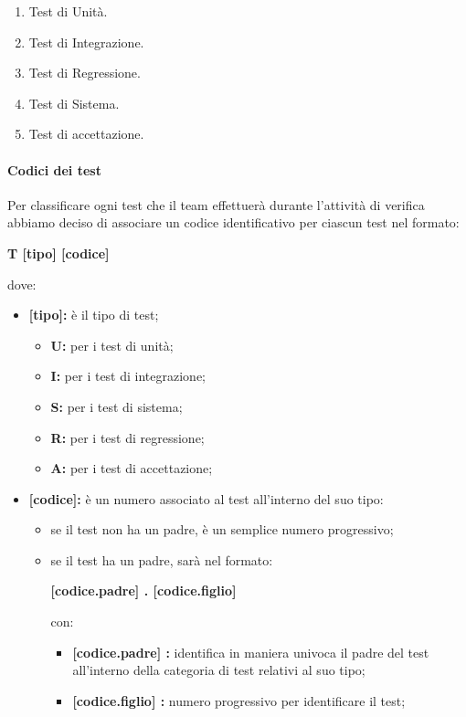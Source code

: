\begin{enumerate}
    \item Test di Unità.
    \item Test di Integrazione.
    \item Test di Regressione.
    \item Test di Sistema.
    \item Test di accettazione.
\end{enumerate}

\paragraph{Codici dei test}
Per classificare ogni test che il team effettuerà durante l'attività di verifica abbiamo deciso di associare un codice identificativo per ciascun test nel formato:

\begin{center}
    \textbf{T [tipo] [codice]}
\end{center}

dove:

\begin{itemize}
    \item \textbf{[tipo]:} 
        è il tipo di test;
        \begin{itemize}
            \item \textbf{U:} 
                per i test di unità;
            \item \textbf{I:} 
                per i test di integrazione;
            \item \textbf{S:} 
                per i test di sistema;
            \item \textbf{R:} 
                per i test di regressione;
            \item\textbf{A:} 
                per i test di accettazione;
        \end{itemize}
    \item \textbf{[codice]:} 
        è un numero associato al test all'interno del suo tipo:
        \begin{itemize}
            \item 
                se il test non ha un padre, è un semplice numero progressivo;
            \item 
                se il test ha un padre, sarà nel formato:
                \begin{center}
                    \textbf{[codice.padre] . [codice.figlio]}
                \end{center}
                con:
                \begin{itemize}
                    \item \textbf{[codice.padre] :} 
                        identifica in maniera univoca il padre del test all'interno della categoria di test relativi al suo tipo;
                    \item \textbf{[codice.figlio] :} 
                        numero progressivo per identificare il test;
                \end{itemize}
        \end{itemize}
\end{itemize}

